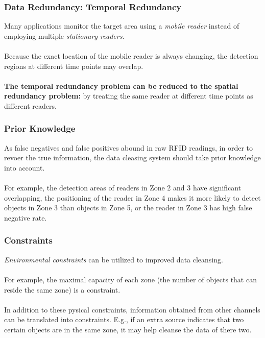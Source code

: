\begin{frame}
\frametitle{Data Redundancy: Temporal Redundancy}

Many applications monitor the target area using a \emph{mobile reader} instead of employing multiple \emph{stationary readers}.\\~\\

Because the exact location of the mobile reader is always changing, the detection regions at different time points may overlap.\\~\\

\textbf{The temporal redundancy problem can be reduced to the spatial redundancy problem:} by treating the same reader at different time points as different readers.

\end{frame}


\begin{frame}
\frametitle{Prior Knowledge}

As false negatives and false positives abound in raw RFID readings, in order to revoer the true information, the data cleasing system should take prior knowledge into account.\\~\\

For example, the detection areas of readers in Zone 2 and 3 have significant overlapping, the positioning of the reader in Zone 4 makes it more likely to detect objects in Zone 3 than objects in Zone 5, or the reader in Zone 3 has high false negative rate.

\end{frame}


\begin{frame}
\frametitle{Constraints}

\emph{Environmental constraints} can be utilized to improved data cleansing.\\~\\

For example, the maximal capacity of each zone (the number of objects that can reside the same zone) is a constraint.\\~\\

In addition to these pysical constraints, information obtained from other channels can be translated into constraints. E.g., if an extra source indicates that two certain objects are in the same zone, it may help cleanse the data of there two.

\end{frame}


